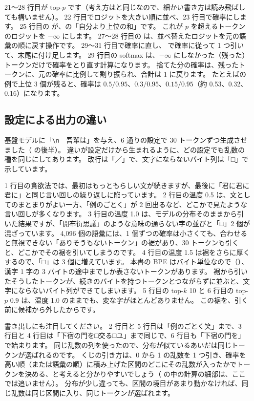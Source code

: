 21〜28 行目が top-$p$ です（考え方はと同じなので、細かい書き方は読み飛ばしても構いません）。
22 行目でロジットを大きい順に並べ、23 行目で確率にします。
25 行目の  が、の「自分より上位の和」です。
これが $p$ を超えるトークンのロジットを $-\infty$ にします。
27〜28 行目の  は、並べ替えたロジットを元の語彙の順に戻す操作です。
29〜31 行目で確率に直し、 で確率に従って 1 つ引いて、末尾に付け足します。
29 行目の softmax は、$-\infty$ にしなかった（残った）トークンだけで確率をとり直す計算になります。
捨てた分の確率は、残ったトークンに、元の確率に比例して割り振られ、合計は 1 に戻ります。
たとえばの例で上位 3 個が残ると、確率は $0.5/0.95$、$0.3/0.95$、$0.15/0.95$（約 0.53、0.32、0.16）になります。

\subsection*{設定による出力の違い}

基盤モデルに「\texttt{\textbackslash n}　吾輩は」を与え、6 通りの設定で 30 トークンずつ生成させました（ の後半）。
違いが設定だけから生まれるように、どの設定でも乱数の種を同じにしてあります。
改行は「／」で、文字にならないバイト列は「□」で示しています。


1 行目の貪欲法では、最初はもっともらしい文が続きますが、最後に「君に君に君に」と同じ言い回しの繰り返しに陥っています。
2 行目の温度 0.5 は、文としてのまとまりがよい一方、「例のごとく」が 2 回出るなど、どこかで見たような言い回しが多くなります。
3 行目の温度 1.0 は、モデルの分布そのままから引いた結果ですが、「開布衍思議」のような意味の通らない字の並びと「□」2 個が混ざっています。
4,096 個の語彙には、1 個ずつの確率は小さくても、合わせると無視できない「ありそうもないトークン」の裾があり、30 トークンも引くと、どこかでその裾を引いてしまうのです。
4 行目の温度 1.5 は裾をさらに厚くするので、「□」は 3 個に増えています。
本書の BPE はバイト単位なので（）、漢字 1 字の 3 バイトの途中までしか表さないトークンがあります。
裾から引いたそうしたトークンが、続きのバイトを持つトークンとつながらずに並ぶと、文字にならないバイト列ができてしまいます。
5 行目の top-$k$ 10 と 6 行目の top-$p$ 0.9 は、温度 1.0 のままでも、変な字がほとんどありません。
この裾を、引く前に候補から外したからです。

書き出しにも注目してください。
2 行目と 5 行目は「例のごとく笑」まで、3 行目と 4 行目は「下宿の門を□交る□ユ」まで同じで、6 行目も「下宿の門を」で始まります。
同じ乱数の列を使ったので、分布が似ているあいだは同じトークンが選ばれるのです。
くじの引き方は、0 から 1 の乱数を 1 つ引き、確率を高い順（または語彙の順）に積み上げた区間のどこにその乱数が入ったかでトークンを決める、と考えると分かりやすいでしょう（ の中の計算の細部は、ここでは追いません）。
分布が少し違っても、区間の境目があまり動かなければ、同じ乱数は同じ区間に入り、同じトークンが選ばれます。

